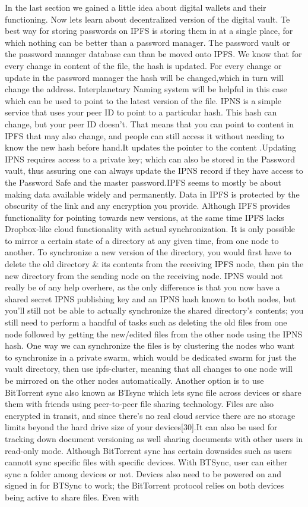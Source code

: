 \documentclass[12pt]{article}
\begin{document}
In the last section we gained a little idea about digital wallets and their functioning. Now lets learn about decentralized version of the digital vault. Te best way for storing passwords on IPFS is storing them in at a single place, for which nothing can be better than a password manager. The password vault or the password manager database can than be moved onto IPFS. We know that for every change in content of the file, the hash is updated. For every change or update in the password manager the hash will be changed,which in turn will change the address. Interplanetary Naming system will be helpful in this case which can be used to point to the latest version of the file. IPNS is a simple service that uses your peer ID to point to a particular hash. This hash can change, but your peer ID doesn’t. That means that you can point to content in IPFS that may also change, and people can still access it without needing to know the new hash before hand.It updates the pointer to the content .Updating IPNS requires access to a private key; which can also be stored in the Password vault, thus assuring one can always update the IPNS record if they have access to the Password Safe and the master password.IPFS seems to mostly be about making data available widely and permanently. Data in IPFS is protected by the obscurity of the link and any encryption you provide. Although IPFS provides functionality for pointing towards new versions, at the same time IPFS lacks Dropbox-like cloud functionality with actual synchronization. It is only possible to mirror a certain state of a directory at any given time, from one node to another. To synchronize a new version of the directory, you would first have to delete the old directory & its contents from the receiving IPFS node, then pin the new directory from the sending node on the receiving node. IPNS would not really be of any help overhere, as the only difference is that you now have a shared secret IPNS publishing key and an IPNS hash known to both nodes, but you’ll still not be able to actually synchronize the shared directory’s contents; you still need to perform a handful of tasks such as  deleting the old files from one node followed by getting the new/edited files from the other node using the IPNS hash. One way we can synchronize the files is by clustering the nodes who want to synchronize in a private swarm, which would be dedicated swarm for just the vault directory, then use ipfs-cluster, meaning that all changes to one node will be mirrored on the other nodes automatically. Another option is to use BitTorrent sync also known as BTsync which lets sync file across devices or share them with friends using peer-to-peer file sharing technology. Files are also encrypted in transit, and since there’s no real cloud service there are no storage limits beyond the hard drive size of your devices[30].It can also be used for tracking down document versioning as well sharing documents with other users in read-only mode. Although BitTorrent sync has certain downsides such as users cannott sync specific files with specific devices. With BTSync, user can either sync a folder among devices or not. Devices also need to be powered on and signed in for BTSync to work; the BitTorrent protocol relies on both devices being active to share files. Even with 
\end{document}
